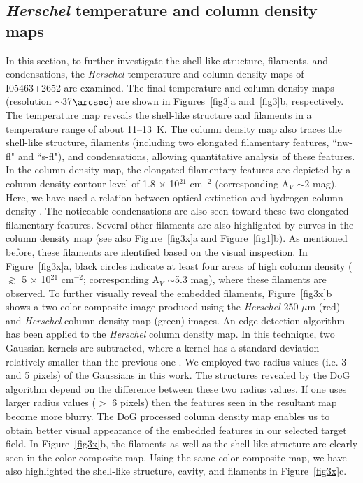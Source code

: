 \documentclass[iop]{emulateapj}
\begin{document}
\subsection{{\it Herschel} temperature and column density maps}
\label{subsec:temp}
%
In this section, to further investigate the shell-like structure, filaments, and condensations, 
the {\it Herschel} temperature and column density maps of I05463+2652 are examined. 
The final temperature and column density maps (resolution $\sim$37$\arcsec$) are shown in Figures~\ref{fig3}a and~\ref{fig3}b, respectively.
The temperature map reveals the shell-like structure and filaments in a temperature range of about 11--13~K.
The column density map also traces the shell-like structure, filaments (including two elongated filamentary features, ``nw-fl" and ``s-fl"), and condensations, allowing quantitative analysis of these features.  
In the column density map, the elongated filamentary features are depicted by a column density contour level of 1.8 $\times$ 10$^{21}$ cm$^{-2}$ (corresponding A$_{V}$ $\sim$2 mag).
Here, we have used a relation between optical extinction and hydrogen column density 
\citep[i.e. $A_V=1.07 \times 10^{-21}~N(\mathrm H_2)$;][]{bohlin78}. 
The noticeable condensations are also seen toward these two elongated filamentary features.
Several other filaments are also highlighted by curves in the column density map (see also Figure~\ref{fig3x}a and Figure~\ref{fig1}b). As mentioned before, these filaments are identified based on the visual inspection. 
In Figure~\ref{fig3x}a, black circles indicate at least four areas of high column density 
($\gtrsim$ 5 $\times$ 10$^{21}$ cm$^{-2}$; corresponding A$_{V}$ $\sim$5.3 mag), 
where these filaments are observed. 
To further visually reveal the embedded filaments, Figure~\ref{fig3x}b shows a two color-composite image produced using the {\it Herschel} 
250 $\mu$m (red) and {\it Herschel} column density map (green) images. 
An edge detection algorithm \citep[i.e. Difference of Gaussian (DoG); see][]{gonzalez11,assirati14} has been applied to the {\it Herschel} 
column density map. In this technique, two Gaussian kernels are subtracted, where a kernel has a standard deviation relatively smaller than the previous one \citep[i.e.][]{assirati14}. We employed two radius values (i.e.  3 and 5 pixels) of the Gaussians in this work. 
The structures revealed by the DoG algorithm depend on the difference between these two radius values.
If one uses larger radius values ($>$ 6 pixels) then the features seen in the resultant map become more blurry. 
The DoG processed column density map enables us to obtain better visual appearance of the embedded features in our selected target field.  
In Figure~\ref{fig3x}b, the filaments as well as the shell-like structure are clearly seen in the color-composite map. 
 Using the same color-composite map, 
we have also highlighted the shell-like structure, cavity, and 
filaments in Figure~\ref{fig3x}c. 
\end{document}
